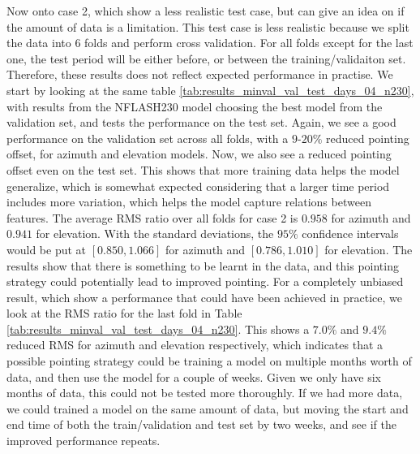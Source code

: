 Now onto case 2, which show a less realistic test case, but can give an idea on if the amount of data is a limitation.
This test case is less realistic because we split the data into $6$ folds and perform cross validation.
For all folds except for the last one, the test period will be either before, or between the training/validaiton set.
Therefore, these results does not reflect expected performance in practise.
We start by looking at the same table \ref{tab:results_minval_val_test_days_04_n230},
with results from the NFLASH230 model choosing the best model from the validation set, and tests the performance on the test set.
Again, we see a good performance on the validation set across all folds, with a $9$-$20\%$ reduced pointing offset, for azimuth and elevation models.
Now, we also see a reduced pointing offset even on the test set.
This shows that more training data helps the model generalize,
which is somewhat expected considering that a larger time period includes more variation, which helps the model capture relations between features.
The average RMS ratio over all folds for case 2 is $0.958$ for azimuth and $0.941$ for elevation.
With the standard deviations, the $95\%$ confidence intervals would be put at $[0.850, 1.066]$ for azimuth and $[0.786, 1.010]$ for elevation.
The results show that there is something to be learnt in the data, and this pointing strategy could potentially lead to improved pointing.
For a completely unbiased result, which show a performance that could have been achieved in practice,
we look at the RMS ratio for the last fold in Table \ref{tab:results_minval_val_test_days_04_n230}.
This shows a $7.0\%$ and $9.4\%$ reduced RMS for azimuth and elevation respectively,
which indicates that a possible pointing strategy could be training a model on multiple months worth of data, and then use the model for a couple of weeks.
Given we only have six months of data, this could not be tested more thoroughly.
If we had more data, we could trained a model on the same amount of data, but moving the start and end time of both the train/validation and test set by two weeks, and
see if the improved performance repeats.







